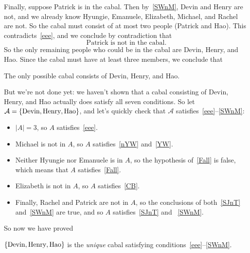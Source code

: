 \documentclass[12pt]{article}
\newcommand{\card}[1]{\left|#1\right|}
\begin{document}
{Finally, suppose Patrick is in the cabal.  Then by~\eqref{SWnM},
Devin and Henry are not, and we already know Hyungie, Emanuele, Elizabeth,
Michael, and Rachel are not. So the cabal must consist of at most two
people (Patrick and Hao). This contradicts~\eqref{eee}, and we conclude
by contradiction that
\begin{equation}\label{nM}
\text{Patrick is not in the cabal.}
\end{equation}
So the only remaining people who could be in the cabal are Devin,
Henry, and Hao.  Since the cabal must have at least three members,
we conclude that
\begin{lemma}
The only possible cabal consists of Devin, Henry, and Hao.
\end{lemma}

But we're not done yet: we haven't shown that a cabal consisting of
Devin, Henry, and Hao actually does satisfy all seven conditions.
So let $\mathcal{A} =\left\{\text{Devin}, \text{Henry},
  \text{Hao}\right\}$, and let's quickly check that $\mathcal{A}$
satisfies~\eqref{eee}--\eqref{SWnM}:

\begin{itemize}

\item $\card{A} = 3$, so $A$ satisfies~\eqref{eee}.
\item Michael is not in $A$, so $A$ satisfies~\eqref{nYW} and~\eqref{YW}.
\item Neither Hyungie nor Emanuele is in $A$, so the hypothesis
  of~\eqref{Fall} is false, which means that $A$
  satisfies~\eqref{Fall}.
\item Elizabeth is not in $A$, so $A$ satisfies~\eqref{CB}.
\item Finally, Rachel and Patrick are not in $A$, so the conclusions of
both~\eqref{SJnT} and~\eqref{SWnM} are true, and so $A$
satisfies~\eqref{SJnT} and ~\eqref{SWnM}.

\end{itemize}

So now we have proved
\begin{proposition*}
$\left\{\text{Devin}, \text{Henry}, \text{Hao}\right\}$ is the \emph{unique} cabal
satisfying conditions~\eqref{eee}--\eqref{SWnM}.
\end{proposition*}}
\end{document}
